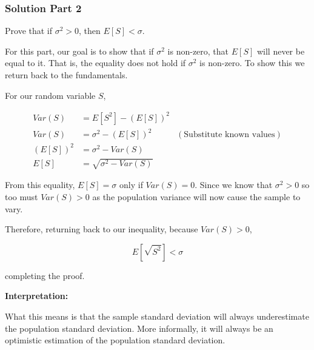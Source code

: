 \subsubsection*{Solution Part 2}

Prove that if $\sigma^2 > 0$, then $E[S] < \sigma$.

For this part, our goal is to show that if $\sigma^2$ is non-zero, that $E[S]$ will never be equal to it. That is, the equality does not hold if $\sigma^2$ is non-zero. To show this we return back to the fundamentals. 

For our random variable $S$,

\begin{align*}
	Var(S) &= E[S^2] - (E[S])^2 \\
	Var(S) &= \sigma^2 - (E[S])^2 & (\text{Substitute known values})\\
	(E[S])^2 &= \sigma^2 - Var(S) \\
	E[S] &= \sqrt{\sigma^2 - Var(S)}
\end{align*}

From this equality, $E[S] = \sigma$ only if $Var(S) = 0$. Since we know that $\sigma^2 > 0$ so too must $Var(S) > 0$ as the population variance will now cause the sample to vary. 

Therefore, returning back to our inequality, because $Var(S) > 0$,

\[E[\sqrt{S^2}] < \sigma\]

completing the proof.

\noindent\textbf{Interpretation:}

What this means is that the sample standard deviation will always underestimate the population standard deviation. More informally, it will always be an optimistic estimation of the population standard deviation.
